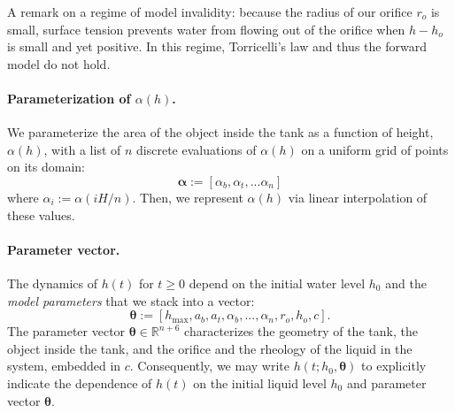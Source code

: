 \documentclass[openacc]{rsproca_new}%
\begin{document}
A remark on a regime of model invalidity: because the radius of our orifice $r_o$ is small, surface tension prevents water from flowing out of the orifice when $h- h_o$ is small and yet positive. In this regime, Torricelli's law and thus the forward model do not hold.

\paragraph{Parameterization of $\alpha(h)$.}
We parameterize the area of the object inside the tank as a function of height, $\alpha(h)$, with a list of $n$ discrete evaluations of $\alpha(h)$ on a uniform grid of points on its domain:
\begin{equation}
	\boldsymbol \alpha := [\alpha_b, \alpha_t, ... \alpha_n]
\end{equation}
where $\alpha_i :=\alpha(i H/n)$. Then, we represent $\alpha(h)$ via linear interpolation of these values.

\paragraph{Parameter vector.} The dynamics of $h(t)$ for $t\geq 0$ depend on the initial water level $h_0$ and the \emph{model parameters} that we stack into a vector:
\begin{equation}
	\boldsymbol \theta := [h_{\text{max}}, a_b, a_t, \alpha_b, ..., \alpha_n , r_o, h_o, c]. \label{eq:theta}
\end{equation}
The parameter vector $\boldsymbol \theta \in \mathbb{R}^{n+6}$ characterizes the geometry of the tank, the object inside the tank, and the orifice and the rheology of the liquid in the system, embedded in $c$. 
Consequently, we may write $h(t; h_0, \boldsymbol \theta)$ to explicitly indicate the dependence of $h(t)$ on the initial liquid level $h_0$ and parameter vector $\boldsymbol \theta$.
\end{document}
